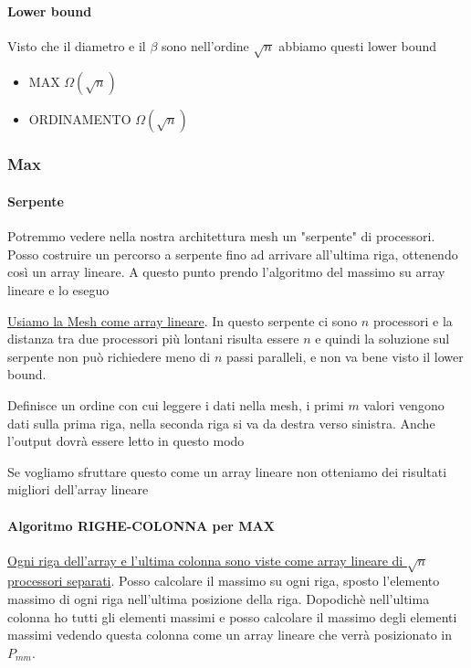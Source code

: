 \paragraph{Lower bound}
Visto che il diametro e il $\beta$ sono nell'ordine $\sqrt{n}$ abbiamo questi lower bound
\begin{itemize}
    \item MAX $\Omega(\sqrt{n})$
    \item ORDINAMENTO $\Omega(\sqrt{n})$
\end{itemize}

\subsubsection{Max}
\paragraph{Serpente}
Potremmo vedere nella nostra architettura mesh un "serpente" di processori. Posso costruire un percorso a serpente fino ad arrivare all'ultima riga, ottenendo così un array lineare. A questo punto prendo l'algoritmo del massimo su array lineare e lo eseguo

\uline{Usiamo la Mesh come array lineare}. In questo serpente ci sono $n$ processori e la distanza tra due processori più lontani risulta essere $n$ e quindi la soluzione sul serpente non può richiedere meno di $n$ passi paralleli, e non va bene visto il lower bound.

Definisce un ordine con cui leggere i dati nella mesh, i primi $m$ valori vengono dati sulla prima riga, nella seconda riga si va da destra verso sinistra. Anche l'output dovrà essere letto in questo modo

Se vogliamo sfruttare questo come un array lineare non otteniamo dei risultati migliori dell'array lineare 

\paragraph{Algoritmo RIGHE-COLONNA per MAX}
\uline{Ogni riga dell'array e l'ultima colonna sono viste come array lineare di $\sqrt{n}$ processori separati}. Posso calcolare il massimo su ogni riga, sposto l'elemento massimo di ogni riga nell'ultima posizione della riga. Dopodichè nell'ultima colonna ho tutti gli elementi massimi e posso calcolare il massimo degli elementi massimi vedendo questa colonna come un array lineare che verrà posizionato in $P_{mm}$.


